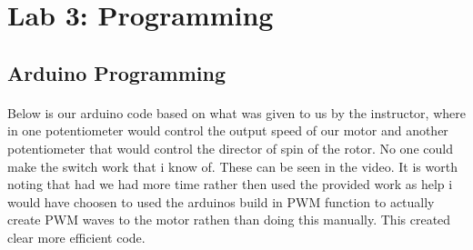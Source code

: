 \documentclass[12pt]{article}
\begin{document}
	\section{Lab 3: Programming}
		\subsection{Arduino Programming}
			\paragraph{}
				Below is our arduino code based on what was given to us by the instructor, where
				in one potentiometer would control the output speed of our motor and another 
				potentiometer that would control the director of spin of the rotor.  No one 
				could make the switch work that i know of.  These can be seen in the video.  It 
				is worth noting that had we had more time rather then used the provided work as 
				help i would have choosen to used the arduinos build in PWM function to actually 
				create PWM waves to the motor rathen than doing this manually.  This created clear 
				more efficient code.
\end{document}
